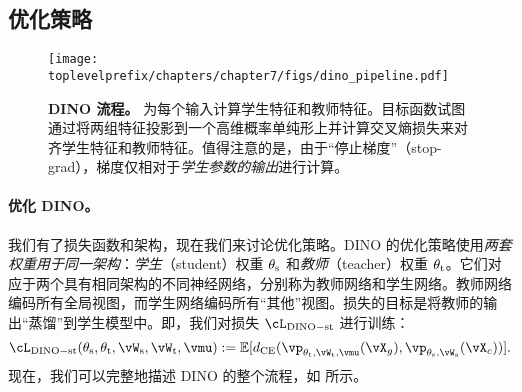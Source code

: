 \documentclass[../../book-main.tex]{subfiles}
\begin{document}
\subsection{优化策略}\label{sub:contrastive_learning_optimization}

\begin{figure}
    \centering 
    \texttt{[image: \\toplevelprefix/chapters/chapter7/figs/dino\_pipeline.pdf]}
    \caption{\small \textbf{DINO 流程。} 为每个输入计算学生特征和教师特征。目标函数试图通过将两组特征投影到一个高维概率单纯形上并计算交叉熵损失来对齐学生特征和教师特征。值得注意的是，由于“停止梯度”（stop-grad），梯度仅相对于\textit{学生参数的输出}进行计算。}
    \label{fig:dino_pipeline}
\end{figure}

\paragraph{优化 DINO。} 我们有了损失函数和架构，现在我们来讨论优化策略。DINO 的优化策略使用\textit{两套权重用于同一架构}：\textit{学生}（student）权重 \(\theta_{\mathrm{s}}\) 和\textit{教师}（teacher）权重 \(\theta_{\mathrm{t}}\)。它们对应于两个具有相同架构的不同神经网络，分别称为教师网络和学生网络。教师网络编码所有全局视图，而学生网络编码所有“其他”视图。损失的目标是将教师的输出“蒸馏”到学生模型中。即，我们对损失 \(\cL_{\dino{}-\student\teacher}\) 进行训练：
\begin{equation}\label{eq:dino_loss_teacherstudent}
    \cL_{\dino{}-\student\teacher}(\theta_{\student}, \theta_{\teacher}, \vW_{\student}, \vW_{\teacher}, \vmu) := \Ex[d_{\CE}(\vp_{\theta_{\teacher}, \vW_{\teacher}, \vmu}(\vX_{g}), \vp_{\theta_{\student}, \vW_{\student}}(\vX_{c}))].
\end{equation}
现在，我们可以完整地描述 DINO 的整个流程，如  所示。
\end{document}
